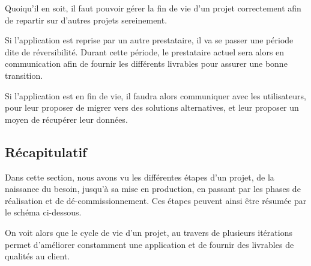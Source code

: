 Quoiqu'il en soit, il faut pouvoir gérer la fin de vie d'un projet correctement afin de repartir sur d'autres projets sereinement. 

Si l'application est reprise par un autre prestataire, il va se passer une période dite de réversibilité. Durant cette période, le prestataire actuel sera alors en communication afin de fournir les différents livrables pour assurer une bonne transition. 

Si l'application est en fin de vie, il faudra alors communiquer avec les utilisateurs, pour leur proposer de migrer vers des solutions alternatives, et leur proposer un moyen de récupérer leur données.

\subsection{Récapitulatif}

Dans cette section, nous avons vu les différentes étapes d'un projet, de la naissance du besoin, jusqu'à sa mise en production, en passant par les phases de réalisation et de dé-commissionnement. Ces étapes peuvent ainsi être résumée par le schéma ci-dessous.


On voit alors que le cycle de vie d'un projet, au travers de plusieurs itérations permet d'améliorer constamment une application et de fournir des livrables de qualités au client.